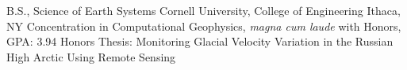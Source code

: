 
        {B.S., Science of Earth Systems}
        {Cornell University, College of Engineering}
        {Ithaca, NY}
        {Concentration in Computational Geophysics, \textit{magna cum laude} with Honors, GPA: 3.94} %
        {Honors Thesis: Monitoring Glacial Velocity Variation in the Russian High Arctic Using Remote Sensing}